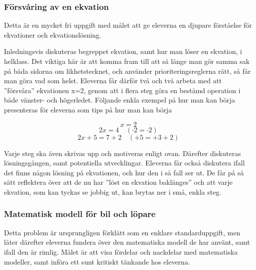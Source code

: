 \subsubsection{Försvåring av en ekvation}
    \label{sec:ekvation}

    \textcolor{lila}{Detta är en mycket fri uppgift med målet att ge eleverna en djupare förståelse för ekvationer och ekvationslösning.}

    \textcolor{lila}{Inledningsvis diskuteras begreppet ekvation, samt hur man löser en ekvation, i helklass. Det viktiga här är att komma fram till att så länge man gör samma sak på båda sidorna om likhetstecknet, och använder prioriteringsreglerna rätt, så får man göra vad som helst. Eleverna får därför två och två arbeta med att ''försvåra'' ekvationen x=2, genom att i flera steg göra en bestämd operation i både vänster- och högerledet. Följande enkla exempel på hur man kan börja presenteras för eleverna som tips på hur man kan börja}
    
        \begin{equation*}
            x=2
        \end{equation*}
        \begin{equation*}
            2x=4 \quad (\cdot2=\cdot2)
        \end{equation*}
        \begin{equation*}
            2x+5=7+2 \quad (+5=+3+2)
        \end{equation*}
    
    \noindent\textcolor{lila}{Varje steg ska även skrivas upp och motiveras enligt ovan. Därefter diskuteras lösningsgången, samt potentiella utvecklingar. Eleverna får också diskutera ifall det finns någon lösning på ekvationen, och hur den i så fall ser ut. De får på så sätt reflektera över att de nu har ''löst en ekvation baklänges'' och att varje ekvation, som kan tyckas se jobbig ut, kan brytas ner i små, enkla steg.}

\subsubsection{Matematisk modell för bil och löpare}
    \label{sec:lopare}
    
    \textcolor{lila}{Detta problem är ursprungligen förklätt som en enklare standarduppgift, men låter därefter eleverna fundera över den matematiska modell de har använt, samt ifall den är rimlig. Målet är att visa fördelar och nackdelar med matematiska modeller, samt införa ett sunt kritiskt tänkande hos eleverna.}
    
